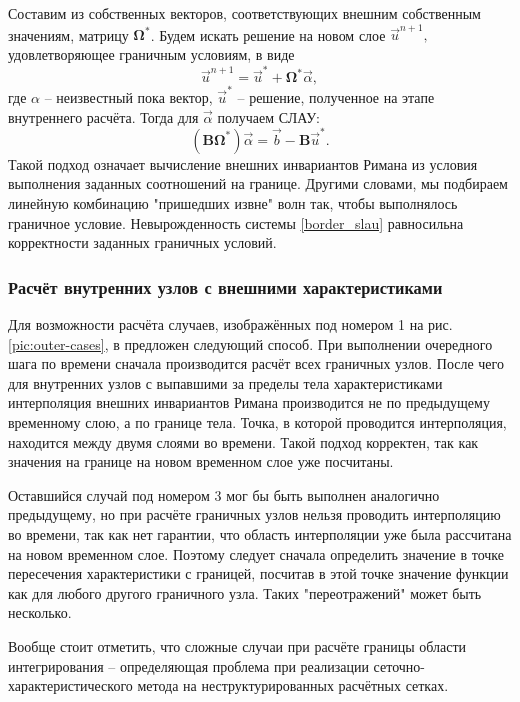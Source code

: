 Составим из собственных векторов, соответствующих внешним собственным значениям, матрицу $\mathbf{\Omega^{*}}$. Будем искать решение на новом слое $\vec{u}^{n+1},$ удовлетворяющее граничным условиям, в виде
\begin{equation}
	\vec{u}^{n+1} = \vec{u}^{*} + \mathbf{\Omega^{*}} \vec{\alpha},
\end{equation}
где $\alpha$ -- неизвестный пока вектор, $\vec{u}^{*}$ -- решение, полученное на этапе внутреннего расчёта. Тогда для $\vec{\alpha}$ получаем СЛАУ:
\begin{equation}
\label{border_slau}
	\left( \mathbf{B} \mathbf{\Omega^{*}} \right) \vec{\alpha} = \vec{b} -  \mathbf{B} \vec{u}^{*}.
\end{equation}
Такой подход означает вычисление внешних инвариантов Римана из условия выполнения заданных соотношений на границе. Другими словами, мы подбираем линейную комбинацию "пришедших извне"\space{} волн так, чтобы выполнялось граничное условие.
Невырожденность системы \eqref{border_slau} равносильна корректности заданных граничных условий.


\subsubsection{Расчёт внутренних узлов с внешними характеристиками}
Для возможности расчёта случаев, изображённых под номером 1 на рис. \ref{pic:outer-cases}, в \cite{magomedov_kholodov_1988} предложен следующий способ. При выполнении  очередного шага по времени сначала производится расчёт всех граничных узлов. После чего для внутренних узлов с выпавшими за пределы тела характеристиками интерполяция внешних инвариантов Римана производится не по предыдущему временному слою, а по границе тела. Точка, в которой проводится интерполяция, находится между двумя слоями во времени. Такой подход корректен, так как значения на границе на новом временном слое уже посчитаны.

Оставшийся случай под номером 3 мог бы быть выполнен аналогично предыдущему, но при расчёте граничных узлов нельзя проводить интерполяцию во времени, так как нет гарантии, что область интерполяции уже была рассчитана на новом временном слое. Поэтому следует сначала определить значение в точке пересечения характеристики с границей, посчитав в этой точке значение функции как для любого другого граничного узла. Таких "переотражений"\space{} может быть несколько.

Вообще стоит отметить, что сложные случаи при расчёте границы области интегрирования -- определяющая проблема при реализации сеточно\hyp{}характеристического метода на неструктурированных расчётных сетках.



